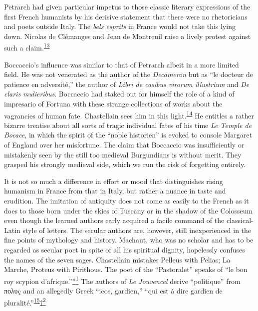 Petrarch had given particular impetus to those classic literary
expressions of the first French humanists by his derisive statement that
there were no rhetoricians and poets outside Italy. The \emph{bels
esprits} in France would not take this lying down. Nicolas de Clémanges
and Jean de Montreuil raise a lively protest against such a
claim.\textsuperscript{\protect\hypertarget{22_Chapter_Fourteen__THE_COMING_OF.xhtmlux5cux23id_98}{\protect\hyperlink{23_NOTES.xhtmlux5cux23id_99}{13}}}

Boccaccio's influence was similar to that of Petrarch albeit in a more
limited field. He was not venerated as the author of the
\emph{Decameron} but as ``le docteur de patience en adversité,'' the
author of \emph{Libri de casibus virorum illustrium} and \emph{De claris
mulieribus}. Boccaccio
\protect\hypertarget{22_Chapter_Fourteen__THE_COMING_OF.xhtmlux5cux23page_386}{}{}had
staked out for himself the role of a kind of impresario of Fortuna with
these strange collections of works about the vagrancies of human fate.
Chastellain sees him in this
light.\textsuperscript{\protect\hypertarget{22_Chapter_Fourteen__THE_COMING_OF.xhtmlux5cux23id_96}{\protect\hyperlink{23_NOTES.xhtmlux5cux23id_97}{14}}}
He entitles a rather bizarre treatise about all sorts of tragic
individual fates of his time \emph{Le Temple de Bocace}, in which the
spirit of the ``noble historien'' is evoked to console Margaret of
England over her misfortune. The claim that Boccaccio was insufficiently
or mistakenly seen by the still too medieval Burgundians is without
merit. They grasped his strongly medieval side, which we run the risk of
forgetting entirely.

It is not so much a difference in effort or mood that distinguishes
rising humanism in France from that in Italy, but rather a nuance in
taste and erudition. The imitation of antiquity does not come as easily
to the French as it does to those born under the skies of Tuscany or in
the shadow of the Colosseum even though the learned authors early
acquired a facile command of the classical-Latin style of letters. The
secular authors are, however, still inexperienced in the fine points of
mythology and history. Machaut, who was no scholar and has to be
regarded as secular poet in spite of all his spiritual dignity,
hopelessly confuses the names of the seven sages. Chastellain mistakes
Pelleus with Pelias; La Marche, Proteus with Pirithous. The poet of the
``Pastoralet'' speaks of ``le bon roy scypion
d'afrique.''\protect\hypertarget{22_Chapter_Fourteen__THE_COMING_OF.xhtmlux5cux23id_2803}{\protect\hyperlink{23_NOTES.xhtmlux5cux23id_2804}{*\textsuperscript{1}}}
The authors of \emph{Le Jouvencel} derive ``politique'' from πολυç and
an allegedly Greek ``icos, gardien,'' ``qui est à dire gardien de
pluralité.''\textsuperscript{\protect\hypertarget{22_Chapter_Fourteen__THE_COMING_OF.xhtmlux5cux23id_94}{\protect\hyperlink{23_NOTES.xhtmlux5cux23id_95}{15}}}\protect\hypertarget{22_Chapter_Fourteen__THE_COMING_OF.xhtmlux5cux23id_2801}{\protect\hyperlink{23_NOTES.xhtmlux5cux23id_2802}{†\textsuperscript{2}}}

